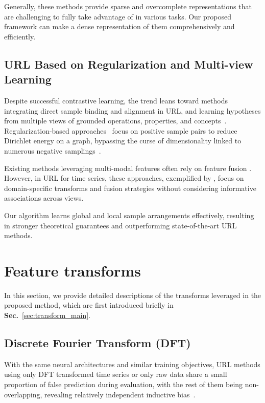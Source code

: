 \documentclass{article}
\begin{document}
Generally, these methods provide sparse and overcomplete representations that are challenging to fully take advantage of in various tasks. Our proposed framework can make a dense representation of them comprehensively and efficiently.


\subsection{URL Based on Regularization and Multi-view Learning}

Despite successful contrastive learning, the trend leans toward methods integrating direct sample binding and alignment in URL, and learning hypotheses from multiple views of grounded operations, properties, and concepts~\cite{girdhar2023imagebind, yariv2023audiotoken}. Regularization-based approaches~\cite{bardes2021vicreg} focus on positive sample pairs to reduce Dirichlet energy on a graph, bypassing the curse of dimensionality linked to numerous negative samplings~\cite{balestriero2022contrastive}.

Existing methods leveraging multi-modal features often rely on feature fusion \cite{yang2022unsupervised, tang2020interpretable}. However, in URL for time series, these approaches, exemplified by \cite{yang2022unsupervised}, focus on domain-specific transforms and fusion strategies without considering informative associations across views. 

Our algorithm learns global and local sample arrangements effectively, resulting in stronger theoretical guarantees and outperforming state-of-the-art URL methods.

\section{Feature transforms}\label{sec:transforms}

In this section, we provide detailed descriptions of the transforms leveraged in the proposed method, which are first introduced briefly in \textbf{Sec.}~\ref{sec:transform_main}.

\subsection{Discrete Fourier Transform (DFT)}

With the same neural architectures and similar training objectives, URL methods using only DFT transformed time series or only raw data share a small proportion of false prediction during evaluation, with the rest of them being non-overlapping, revealing relatively independent inductive bias~\cite{yang2022unsupervised}. 
\end{document}
